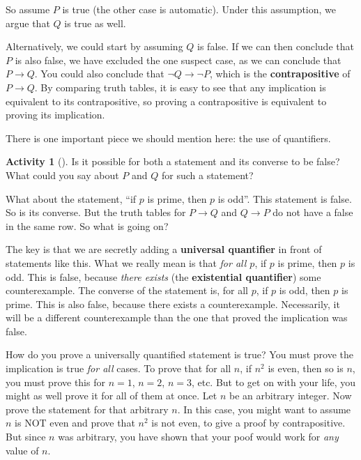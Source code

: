 \documentclass[10pt,]{book}
\newcommand{\terminology}[1]{\textbf{#1}}
\theoremstyle{plain}
\theoremstyle{definition}
\theoremstyle{definition}
\theoremstyle{definition}
\newtheorem{activity}[project]{Activity}
\numberwithin{equation}{chapter}
\def\imp{\rightarrow}
\begin{document}
\hypertarget{p-172}{}%
So assume \(P\) is true (the other case is automatic).  Under this assumption, we argue that \(Q\) is true as well.%
\par
\hypertarget{p-173}{}%
Alternatively, we could start by assuming \(Q\) is false.  If we can then conclude that \(P\) is also false, we have excluded the one suspect case, as we can conclude that \(P \imp Q\).  You could also conclude that \(\neg Q \imp \neg P\), which is the \terminology{contrapositive} of \(P \imp Q\).  By comparing truth tables, it is easy to see that any implication is equivalent to its contrapositive, so proving a contrapositive is equivalent to proving its implication.%
\par
\hypertarget{p-174}{}%
There is one important piece we should mention here: the use of quantifiers.%
\begin{activity}[]\label{activity-9}
\hypertarget{p-175}{}%
Is it possible for both a statement and its converse to be false?  What could you say about \(P\) and \(Q\) for such a statement?%
\end{activity}
\hypertarget{p-176}{}%
What about the statement, ``if \(p\) is prime, then \(p\) is odd''.  This statement is false.  So is its converse.  But the truth tables for \(P \imp Q\) and \(Q \imp P\) do not have a false in the same row.  So what is going on?%
\par
\hypertarget{p-177}{}%
The key is that we are secretly adding a \terminology{universal quantifier} in front of statements like this.  What we really mean is that \emph{for all \(p\)}, if \(p\) is prime, then \(p\) is odd.  This is false, because \emph{there exists} (the \terminology{existential quantifier}) some counterexample.  The converse of the statement is, for all \(p\), if \(p\) is odd, then \(p\) is prime.  This is also false, because there exists a counterexample.  Necessarily, it will be a different counterexample than the one that proved the implication was false.%
\par
\hypertarget{p-178}{}%
How do you prove a universally quantified statement is true?  You must prove the implication is true \emph{for all} cases.  To prove that for all \(n\), if \(n^2\) is even, then so is \(n\), you must prove this for \(n = 1\), \(n = 2\), \(n =3\), etc.  But to get on with your life, you might as well prove it for all of them at once.  Let \(n\) be an arbitrary integer.  Now prove the statement for that arbitrary \(n\).  In this case, you might want to assume \(n\) is NOT even and prove that \(n^2\) is not even, to give a proof by contrapositive.  But since \(n\) was arbitrary, you have shown that your poof would work for \emph{any} value of \(n\).%
\typeout{************************************************}
\typeout{************************************************}
\end{document}
